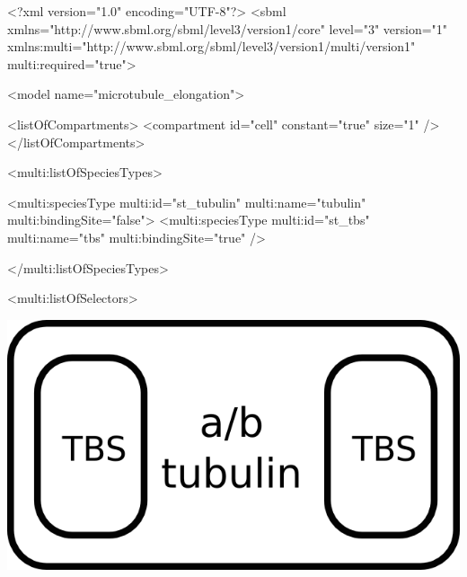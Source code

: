 \begin{example}
<?xml version="1.0" encoding="UTF-8"?>
<sbml xmlns="http://www.sbml.org/sbml/level3/version1/core" level="3" version="1"
      xmlns:multi="http://www.sbml.org/sbml/level3/version1/multi/version1"
      multi:required="true">

  <model name="microtubule_elongation">

    <listOfCompartments>
      <compartment id="cell" constant="true" size="1" />
    </listOfCompartments>

    <multi:listOfSpeciesTypes>
    
      <multi:speciesType multi:id="st_tubulin" multi:name="tubulin" multi:bindingSite="false">
      <multi:speciesType multi:id="st_tbs" multi:name="tbs" multi:bindingSite="true" />
    
    </multi:listOfSpeciesTypes>

    <multi:listOfSelectors>
\end{example}

\includegraphics{figs/pngs/sel_tubulin_free.png}


